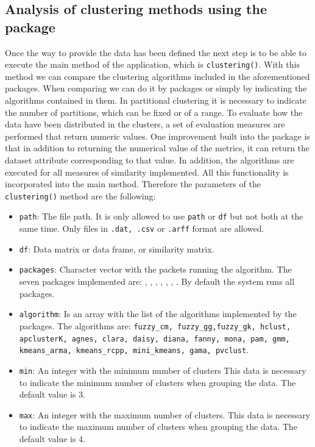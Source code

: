 \subsection {Analysis of clustering methods using the  package}

Once the way to provide the data has been defined the next step is to be able to execute the main method of the application, which is \texttt{clustering()}. With this method we can compare the clustering algorithms included in the aforementioned packages. When comparing we can do it by packages or simply by indicating the algorithms contained in them. In partitional clustering it is necessary to indicate the number of partitions, which can be fixed or of a range. To evaluate how the data have been distributed in the clusters, a set of evaluation measures are performed that return numeric values. One improvement built into the package is that in addition to returning the numerical value of the metrics, it can return the dataset attribute corresponding to that value. In addition, the algorithms are executed for all measures of similarity implemented. All this functionality is incorporated into the main method. Therefore the parameters of the \texttt{clustering()} method are the following:
\begin{itemize}
  \item \texttt{path}: The file path. It is only allowed to use \texttt{path} or \texttt{df} but not both at the same time. Only files in \texttt{.dat, .csv} or \texttt{.arff} format are allowed.
  \item \texttt{df}: Data matrix or data frame, or similarity matrix.
  \item \texttt{packages}: Character vector with the packets running the algorithm. The seven packages implemented are: , , , , , , . By default the system runs all packages.
  \item \texttt{algorithm}: Is an array with the list of the algorithms implemented by the packages. The algorithms are: \texttt{fuzzy\_cm, fuzzy\_gg,fuzzy\_gk, hclust, apclusterK, agnes, clara, daisy, diana, fanny, mona, pam, gmm, kmeans\_arma, kmeans\_rcpp, mini\_kmeans, gama, pvclust}.
  \item \texttt{min}: An integer with the minimum number of clusters This data is necessary to indicate the minimum number of clusters when grouping the data. The default value is 3.
  \item \texttt{max}: An integer with the maximum number of clusters. This data is necessary to indicate the maximum number of clusters when grouping the data. The default value is 4.
\end{itemize}
